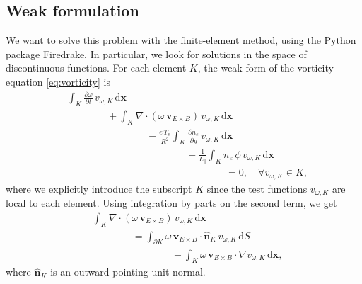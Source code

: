 \documentclass[12pt]{article}
\begin{document}
\subsection{Weak formulation}

We want to solve this problem with the finite-element method, using the Python package Firedrake. In particular, we look for solutions in the space of discontinuous functions. For each element $K$, the weak form of the vorticity equation \cref{eq:vorticity} is
%
\begin{equation}
    \begin{aligned}
        & \int_K \frac{\partial \omega}{\partial t} \, v_{\omega,K} \, \mathrm{d}\bm{x} \\
        & \hspace{4em} + \int_K \nabla \cdot ( \omega \, \bm{v}_{E \times B} ) \, v_{\omega,K} \, \mathrm{d}\bm{x} \\
        & \hspace{8em} - \frac{e \, T_e}{R^2} \int_K \frac{\partial n_e}{\partial y} \, v_{\omega,K} \, \mathrm{d}\bm{x} \\
        & \hspace{12em} - \frac{1}{L_\parallel} \int_K n_e \, \phi \, v_{\omega,K} \, \mathrm{d}\bm{x} \\
        & \hspace{16em} = 0 , \quad \forall v_{\omega,K} \in K ,
    \end{aligned}
\end{equation}
%
where we explicitly introduce the subscript $K$ since the test functions $v_{\omega,K}$ are local to each element. Using integration by parts on the second term, we get
%
\begin{equation}
    \begin{aligned}
        & \int_K \nabla \cdot (\omega \, \bm{v}_{E \times B}) \, v_{\omega,K} \, \mathrm{d}\bm{x} \\
        & \hspace{4em} = \int_{\partial K} \omega \, \bm{v}_{E \times B} \cdot \hat{\bm{n}}_K \, v_{\omega,K} \, \mathrm{d}S \\
        & \hspace{8em} - \int_K \omega \, \bm{v}_{E \times B} \cdot \nabla v_{\omega,K} \, \mathrm{d}\bm{x} ,
    \end{aligned}
\end{equation}
%
where $\hat{\bm{n}}_K$ is an outward-pointing unit normal.
\end{document}
